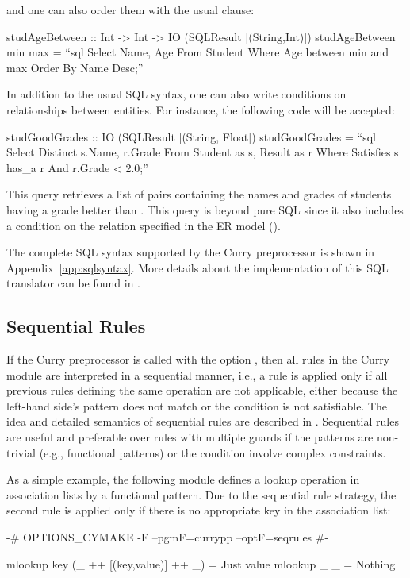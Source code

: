 and one can also order them with the usual  clause:
%
\begin{curry}
studAgeBetween :: Int -> Int -> IO (SQLResult [(String,Int)])
studAgeBetween min max =
  ``sql Select Name, Age
        From Student Where Age between {min} and {max}
        Order By Name Desc;''
\end{curry}
%
In addition to the usual SQL syntax, one can also
write conditions on relationships between entities.
For instance, the following code will be accepted:
%
\begin{curry}
studGoodGrades :: IO (SQLResult [(String, Float])
studGoodGrades = ``sql Select Distinct s.Name, r.Grade 
                       From Student as s, Result as r
                       Where Satisfies s has_a r And r.Grade < 2.0;''
\end{curry}
%
This query retrieves a list of pairs containing the
names and grades of students having a grade better than .
This query is beyond pure SQL since it also includes
a condition on the relation  specified in the ER model
().

The complete SQL syntax supported by the Curry preprocessor
is shown in Appendix~\ref{app:sqlsyntax}.
More details about the implementation of this
SQL translator can be found in \cite{HanusKrone16WFLP,Krone15}.


\subsection{Sequential Rules}

If the Curry preprocessor is called with the option
, then all rules in the Curry module are
interpreted in a sequential manner, i.e., a rule is applied only
if all previous rules defining the same operation are not applicable,
either because the left-hand side's pattern does not match
or the condition is not satisfiable.
The idea and detailed semantics of
sequential rules are described in \cite{AntoyHanus14}.
Sequential rules are useful and preferable over
rules with multiple guards if the patterns are non-trivial
(e.g., functional patterns) or the condition involve complex
constraints.

As a simple example, the following module defines
a lookup operation in association lists by a functional pattern.
Due to the sequential rule strategy,
the second rule is applied only if there is no appropriate
key in the association list:
%
\begin{curry}
{-# OPTIONS_CYMAKE -F --pgmF=currypp --optF=seqrules #-}

mlookup key (_ ++ [(key,value)] ++ _) = Just value
mlookup _   _                         = Nothing 
\end{curry}


